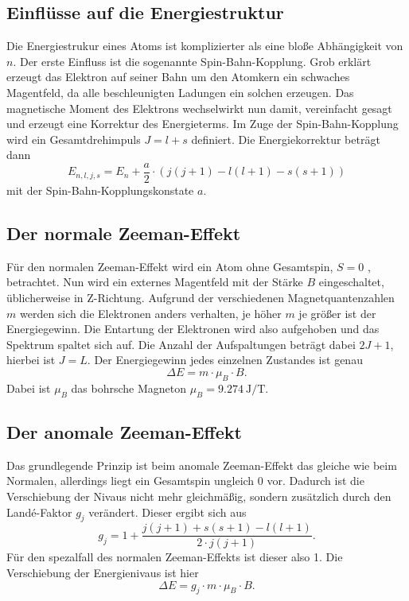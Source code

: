 \subsection{Einflüsse auf die Energiestruktur}
\label{ssec:theo2}

Die Energiestrukur eines Atoms ist komplizierter als eine bloße Abhängigkeit von $n$.
Der erste Einfluss ist die sogenannte Spin-Bahn-Kopplung.
Grob erklärt erzeugt das Elektron auf seiner Bahn um den Atomkern ein schwaches Magentfeld, da alle beschleunigten Ladungen ein solchen erzeugen.
Das magnetische Moment des Elektrons wechselwirkt nun damit, vereinfacht gesagt und erzeugt eine Korrektur des Energieterms. 
Im Zuge der Spin-Bahn-Kopplung wird ein Gesamtdrehimpuls $J = l + s$ definiert.
Die Energiekorrektur beträgt dann 
\begin{equation}
    E_{n,l,j,s} = E_n + \frac{a}{2} \cdot \left( j(j+1) - l(l+1) - s(s+1) \right)
   \label{eq:spinbahn}
\end{equation}
mit der Spin-Bahn-Kopplungskonstate $a$.

\subsection{Der normale Zeeman-Effekt}
\label{ssec:theo3}

Für den normalen Zeeman-Effekt wird ein Atom ohne Gesamtspin, $S = 0$ , betrachtet. 
Nun wird ein externes Magentfeld mit der Stärke $B$ eingeschaltet, üblicherweise in Z-Richtung. 
Aufgrund der verschiedenen Magnetquantenzahlen $m$ werden sich die Elektronen anders verhalten, je höher $m$ je größer ist der Energiegewinn.
Die Entartung der Elektronen wird also aufgehoben und das Spektrum spaltet sich auf.
Die Anzahl der Aufspaltungen beträgt dabei $2 J + 1$, hierbei ist $J = L$.
Der Energiegewinn jedes einzelnen Zustandes ist genau 
\begin{equation}
    \Delta E = m \cdot \mu_B \cdot B.
   \label{eq:normzeeman}
\end{equation}
Dabei ist $\mu_B$ das bohrsche Magneton $\mu_B = \SI{9.274}{\joule\per\tesla}$.

\subsection{Der anomale Zeeman-Effekt}
\label{ssec:theo4}

Das grundlegende Prinzip ist beim anomale Zeeman-Effekt das gleiche wie beim Normalen, allerdings liegt ein Gesamtspin ungleich $0$ vor.
Dadurch ist die Verschiebung der Nivaus nicht mehr gleichmäßig, sondern zusätzlich durch den Landé-Faktor $g_j$ verändert. 
Dieser ergibt sich aus 
\begin{equation}
    g_j = 1 + \frac{j(j+1) + s(s+1) - l(l+1) }{2 \cdot j(j+1)}.
   \label{eq:lande}
\end{equation}
Für den spezalfall des normalen Zeeman-Effekts ist dieser also 1.
Die Verschiebung der Energienivaus ist hier
\begin{equation}
    \Delta E = g_j \cdot m \cdot \mu_B \cdot B.
   \label{eq:anomzeeman}
\end{equation}

